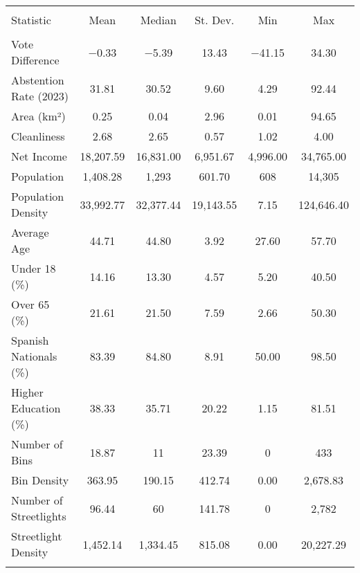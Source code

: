 
\begingroup 
\scriptsize 
\begin{tabular}{@{\extracolsep{5pt}}lccccc} 
\\[-1.8ex]\hline 
\hline \\[-1.8ex] 
Statistic & \multicolumn{1}{c}{Mean} & \multicolumn{1}{c}{Median} & \multicolumn{1}{c}{St. Dev.} & \multicolumn{1}{c}{Min} & \multicolumn{1}{c}{Max} \\ 
\hline \\[-1.8ex] 
Vote Difference & $-$0.33 & $-$5.39 & 13.43 & $-$41.15 & 34.30 \\ 
Abstention Rate (2023) & 31.81 & 30.52 & 9.60 & 4.29 & 92.44 \\ 
Area (km²) & 0.25 & 0.04 & 2.96 & 0.01 & 94.65 \\ 
Cleanliness & 2.68 & 2.65 & 0.57 & 1.02 & 4.00 \\ 
Net Income & 18,207.59 & 16,831.00 & 6,951.67 & 4,996.00 & 34,765.00 \\ 
Population & 1,408.28 & 1,293 & 601.70 & 608 & 14,305 \\ 
Population Density & 33,992.77 & 32,377.44 & 19,143.55 & 7.15 & 124,646.40 \\ 
Average Age & 44.71 & 44.80 & 3.92 & 27.60 & 57.70 \\ 
Under 18 (\%) & 14.16 & 13.30 & 4.57 & 5.20 & 40.50 \\ 
Over 65 (\%) & 21.61 & 21.50 & 7.59 & 2.66 & 50.30 \\ 
Spanish Nationals (\%) & 83.39 & 84.80 & 8.91 & 50.00 & 98.50 \\ 
Higher Education (\%) & 38.33 & 35.71 & 20.22 & 1.15 & 81.51 \\ 
Number of Bins & 18.87 & 11 & 23.39 & 0 & 433 \\ 
Bin Density & 363.95 & 190.15 & 412.74 & 0.00 & 2,678.83 \\ 
Number of Streetlights & 96.44 & 60 & 141.78 & 0 & 2,782 \\ 
Streetlight Density & 1,452.14 & 1,334.45 & 815.08 & 0.00 & 20,227.29 \\ 
\hline \\[-1.8ex] 
\end{tabular} 
\endgroup 

